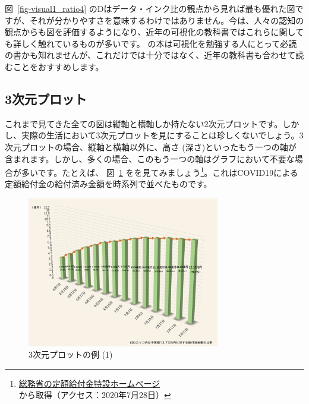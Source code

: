 \documentclass[
  a4paper,
  pandoc,
  ja=standard,
  jafont=haranoaji]{bxjsbook}
\begin{document}
図~\ref{fig-visual1_ratio4}
のDはデータ・インク比の観点から見れば最も優れた図ですが、それが分かりやすさを意味するわけではありません。今は、人々の認知の観点からも図を評価するようになり、近年の可視化の教科書ではこれらに関しても詳しく触れているものが多いです。\citet{Tufte:2001}
の本は可視化を勉強する人にとって必読の書かも知れませんが、これだけでは十分ではなく、近年の教科書も合わせて読むことをおすすめします。

\hypertarget{ux6b21ux5143ux30d7ux30edux30c3ux30c8}{%
\subsection{3次元プロット}\label{ux6b21ux5143ux30d7ux30edux30c3ux30c8}}

これまで見てきた全ての図は縦軸と横軸しか持たない2次元プロットです。しかし、実際の生活において3次元プロットを見にすることは珍しくないでしょう。3次元プロットの場合、縦軸と横軸以外に、高さ
(深さ)といったもう一つの軸が含まれます。しかし、多くの場合、このもう一つの軸はグラフにおいて不要な場合が多いです。たとえば、
図~\ref{fig-visual1_3dplot1}
をを見てみましょう\footnote{\href{https://kyufukin.soumu.go.jp/ja-JP/transition/}{総務省の定額給付金特設ホームページ}から取得（アクセス：2020年7月28日）}。これはCOVID19による定額給付金の給付済み金額を時系列で並べたものです。

\begin{figure}

{\centering \includegraphics[width=0.75\textwidth,height=\textheight]{./Figs/Visualization1/garbage_graph.png}

}

\caption{\label{fig-visual1_3dplot1}3次元プロットの例 (1)}

\end{figure}
\end{document}
